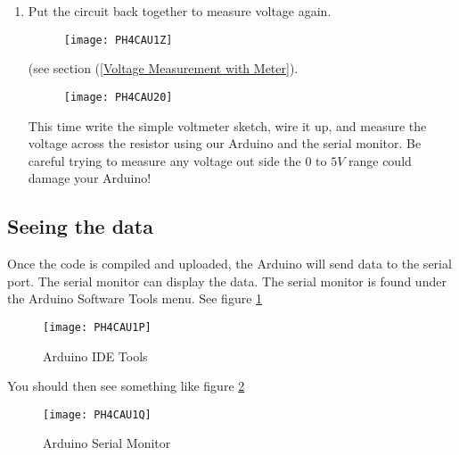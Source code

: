 \begin{enumerate}
	\item Put the circuit back together to measure voltage again.
	 \begin{figure}[h!]
		\texttt{[image: PH4CAU1Z]}
	\end{figure}(see section (\ref{Voltage
		Measurement with Meter}). \begin{figure}[h!]
		\texttt{[image: PH4CAU20]}
	\end{figure}This time write the simple voltmeter sketch, wire it up, and measure the voltage across the resistor
	using our Arduino and the serial monitor. Be careful trying to measure any voltage out side the $0$ to $5\unit{V}$ range could damage your Arduino!
	
	


\end{enumerate}












\subsection{Seeing the data}

Once the code is compiled and uploaded, the Arduino will send data to the
serial port. The serial monitor can display the data. The serial monitor is
found under the Arduino Software Tools menu. See figure \ref{tools}

\begin{figure}[h!]
	\caption{Arduino IDE Tools\label{tools}}
	\texttt{[image: PH4CAU1P]}
\end{figure}
You should then see something like figure \ref{monitor}

\begin{figure}[h!]
	\caption{Arduino Serial Monitor\label{monitor}}
	\texttt{[image: PH4CAU1Q]}
\end{figure}

